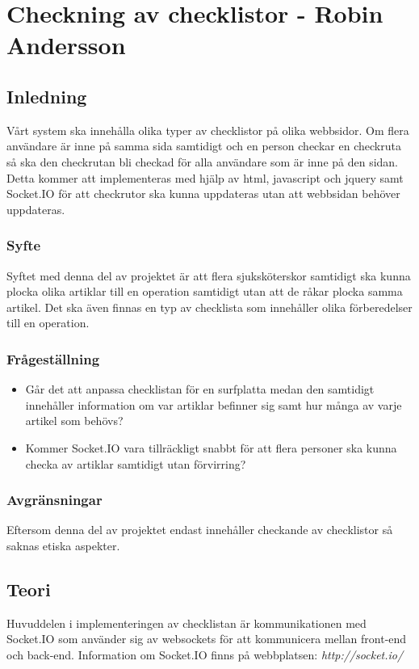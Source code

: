 \section{Checkning av checklistor - Robin Andersson}
\subsection{Inledning}
Vårt system ska innehålla olika typer av checklistor på olika webbsidor. Om flera användare är inne på samma sida samtidigt och en person checkar en checkruta så ska den checkrutan bli checkad för alla användare som är inne på den sidan.\\

Detta kommer att implementeras med hjälp av html, javascript och jquery samt Socket.IO för att checkrutor ska kunna uppdateras utan att webbsidan behöver uppdateras.

\subsubsection{Syfte}
Syftet med denna del av projektet är att flera sjuksköterskor samtidigt ska kunna plocka olika artiklar till en operation samtidigt utan att de råkar plocka samma artikel. Det ska även finnas en typ av checklista som innehåller olika förberedelser till en operation. 

\subsubsection{Frågeställning}
\begin{itemize}
\item Går det att anpassa checklistan för en surfplatta medan den samtidigt innehåller information om var artiklar befinner sig samt hur många av varje artikel som behövs?
\item Kommer Socket.IO vara tillräckligt snabbt för att flera personer ska kunna checka av artiklar samtidigt utan förvirring?
\end{itemize}

\subsubsection{Avgränsningar}
Eftersom denna del av projektet endast innehåller checkande av checklistor så saknas etiska aspekter.

\subsection{Teori}
Huvuddelen i implementeringen av checklistan är kommunikationen med Socket.IO som använder sig av websockets för att kommunicera mellan front-end och back-end. Information om Socket.IO finns på webbplatsen: \textit{http://socket.io/}

